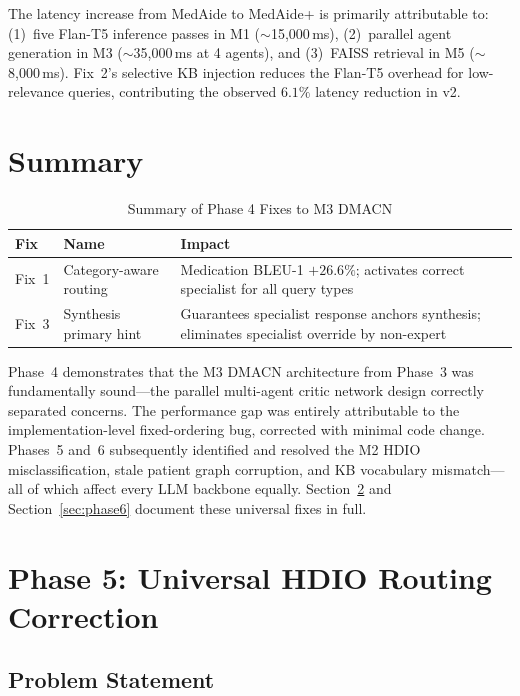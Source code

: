 \documentclass[a4paper,12pt]{article}
\begin{document}
The latency increase from MedAide to MedAide+ is primarily attributable to:
(1)~five Flan-T5 inference passes in M1 ($\sim$15{,}000\,ms),
(2)~parallel agent generation in M3 ($\sim$35{,}000\,ms at 4 agents), and
(3)~FAISS retrieval in M5 ($\sim$8{,}000\,ms). Fix~2's selective KB injection
reduces the Flan-T5 overhead for low-relevance queries, contributing the
observed $6.1\%$ latency reduction in v2.

\section{Summary}

\begin{table}[h]
\centering
\caption{Summary of Phase 4 Fixes to M3 DMACN}
\begin{tabular}{p{1.2cm}p{2.8cm}p{4.8cm}}
\toprule
\textbf{Fix} & \textbf{Name} & \textbf{Impact} \\
\midrule
Fix~1 & Category-aware routing & Medication BLEU-1 $+26.6\%$; activates
        correct specialist for all query types \\
Fix~3 & Synthesis primary hint & Guarantees specialist response anchors
        synthesis; eliminates specialist override by non-expert \\
\bottomrule
\end{tabular}
\end{table}

\noindent Phase~4 demonstrates that the M3 DMACN architecture from Phase~3
was fundamentally sound---the parallel multi-agent critic network
design correctly separated concerns. The performance gap was entirely
attributable to the implementation-level fixed-ordering bug, corrected
with minimal code change. Phases~5 and~6 subsequently identified and
resolved the M2 HDIO misclassification, stale patient graph corruption,
and KB vocabulary mismatch---all of which affect every LLM backbone
equally. Section~\ref{sec:phase5} and Section~\ref{sec:phase6} document
these universal fixes in full.

\section{Phase 5: Universal HDIO Routing Correction}
\label{sec:phase5}

\subsection{Problem Statement}
\end{document}
